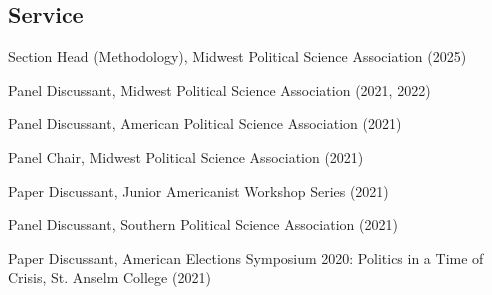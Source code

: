 \documentclass[letterpaper]{article}
\renewenvironment{itemize}{
  \begin{list}{}{
    \setlength{\leftmargin}{1.5em}
  }
}{
  \end{list}
}
\begin{document}
\subsection*{Service}
\begin{itemize}

\item Section Head (Methodology), Midwest Political Science Association (2025)

\item Panel Discussant, Midwest Political Science Association (2021, 2022)

\item Panel Discussant, American Political Science Association (2021)

\item Panel Chair, Midwest Political Science Association (2021)

\item Paper Discussant, Junior Americanist Workshop Series (2021)

\item Panel Discussant, Southern Political Science Association (2021)

\item Paper Discussant, American Elections Symposium 2020: Politics in a Time of Crisis, St. Anselm College (2021)

\end{itemize}
\end{document}
